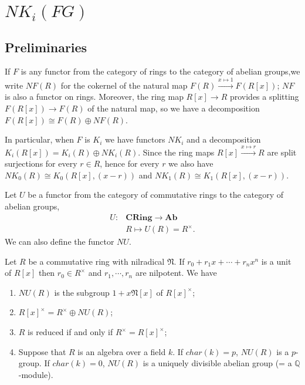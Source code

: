 \chapter{$NK_i(FG)$ } %

\section{Preliminaries} %
\label{sec:preliminaries}

\begin{definition}
	If $F$ is any functor from the category of rings to the category of abelian groups,we write $NF(R)$ for the cokernel of the natural map $F(R)\overset{x \mapsto 1} \longrightarrow F(R[x])$; $NF$ is also a functor on rings. Moreover, the ring map $R[x] \longrightarrow R$ provides a splitting $F(R[x]) \longrightarrow  F(R)$ of the natural map, so we have a decomposition $F(R[x])\cong F(R) \oplus NF(R)$.
\end{definition}
In particular, when $F$ is $K_i$ we have functors $NK_i$ and a decomposition $K_i(R[x]) = K_i(R) \oplus NK_i(R)$. Since the ring maps $R[x] \overset{x\mapsto r}\longrightarrow R$ are split surjections for every $r \in R$, hence for every $r$ we also have $NK_0(R)\cong K_0(R[x],(x-r))$ and $NK_1(R)\cong K_1(R[x],(x-r))$.

Let $U$ be a functor from the category of commutative rings to the category of abelian groups,
\begin{align*}
U\colon & \mathbf{CRing} \longrightarrow \mathbf{Ab}\\
		& R \mapsto U(R)=R^{\times}.
\end{align*}
We can also define the functor $NU$.

\begin{lemma}
	Let $R$ be a commutative ring with nilradical $\mathfrak{N}$. If $r_0 + r_1x + \cdots + r_nx^n$ is a unit of $R[x]$ then $r_0 \in R^{\times}$ and $r_1, \cdots, r_n$ are nilpotent. We have 
\begin{enumerate}
	\item  $NU(R)$ is the subgroup $1 + x\mathfrak{N}[x]$ of $R[x]^{\times}$;
	\item $R[x]^{\times} = R^{\times} \oplus NU(R)$;
	\item $R$ is reduced if and only if $R^{\times} = R[x]^{\times}$;
	\item Suppose that $R$ is an algebra over a field $k$. If $char(k)=p$, $NU(R)$ is a $p$-group. If $char(k) = 0$, $NU(R)$ is a uniquely divisible abelian group (= a $\mathbb{Q}$-module).
\end{enumerate}
\end{lemma}

